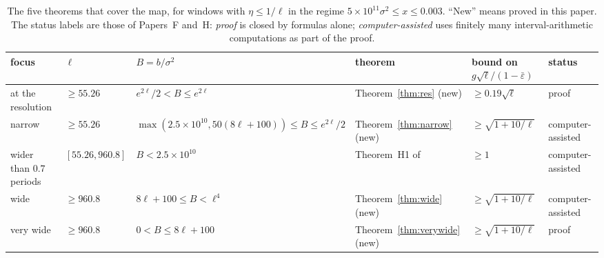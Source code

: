 \begin{table}
\caption{The five theorems that cover the map, for windows with $\eta\le1/\ell$ in the regime $5\times10^{11}\sigma^2\le x\le0.003$. ``New'' means proved in this paper. The status labels are those of Papers~F and~H: \emph{proof} is closed by formulas alone; \emph{computer-assisted} uses finitely many interval-arithmetic computations as part of the proof.}
\label{tab:map}
\begin{ruledtabular}
\small
\begin{tabular}{p{}p{}p{}p{}p{}p{}}
focus & $\ell$ & $B=b/\sigma^2$ & theorem & bound on $g\sqrt\ell/(1-\bar\varepsilon)$ & status\\ \hline
at the resolution & $\ge55.26$ & $e^{2\ell}/2<B\le e^{2\ell}$ & Theorem~\ref{thm:res} (new) & $\ge0.19\sqrt\ell$ & proof\\
narrow & $\ge55.26$ & $\max(2.5\times10^{10},50(8\ell+100))\le B\le e^{2\ell}/2$ & Theorem~\ref{thm:narrow} (new) & $\ge\sqrt{1+10/\ell}$ & computer-assisted\\
wider than $0.7$ periods & $[55.26,960.8]$ & $B<2.5\times10^{10}$ & Theorem~H1 of~\cite{H} & $\ge1$ & computer-assisted\\
wide & $\ge960.8$ & $8\ell+100\le B<\ell^4$ & Theorem~\ref{thm:wide} (new) & $\ge\sqrt{1+10/\ell}$ & computer-assisted\\
very wide & $\ge960.8$ & $0<B\le8\ell+100$ & Theorem~\ref{thm:verywide} (new) & $\ge\sqrt{1+10/\ell}$ & proof\\
\end{tabular}
\end{ruledtabular}
\end{table}

